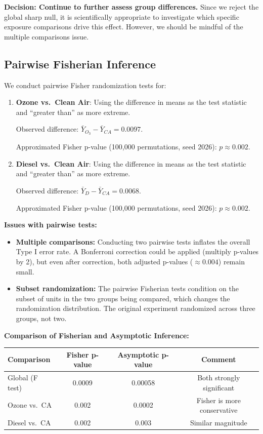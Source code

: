 \documentclass[11pt]{article}
\begin{document}
\textbf{Decision: Continue to further assess group differences.} Since we reject the global sharp null, it is scientifically appropriate to investigate which specific exposure comparisons drive this effect. However, we should be mindful of the multiple comparisons issue.

\subsection*{Pairwise Fisherian Inference}

We conduct pairwise Fisher randomization tests for:
\begin{enumerate}
  \item \textbf{Ozone vs.\ Clean Air}: Using the difference in means as the test statistic and ``greater than'' as more extreme.

  Observed difference: $\bar{Y}_{O_3} - \bar{Y}_{CA} = 0.0097$.

  Approximated Fisher p-value (100,000 permutations, seed 2026): $p \approx 0.002$.

  \item \textbf{Diesel vs.\ Clean Air}: Using the difference in means as the test statistic and ``greater than'' as more extreme.

  Observed difference: $\bar{Y}_{D} - \bar{Y}_{CA} = 0.0068$.

  Approximated Fisher p-value (100,000 permutations, seed 2026): $p \approx 0.002$.
\end{enumerate}

\textbf{Issues with pairwise tests:}
\begin{itemize}
  \item \textbf{Multiple comparisons:} Conducting two pairwise tests inflates the overall Type I error rate. A Bonferroni correction could be applied (multiply p-values by 2), but even after correction, both adjusted p-values ($\approx 0.004$) remain small.
  \item \textbf{Subset randomization:} The pairwise Fisherian tests condition on the subset of units in the two groups being compared, which changes the randomization distribution. The original experiment randomized across three groups, not two.
\end{itemize}

\textbf{Comparison of Fisherian and Asymptotic Inference:}

\begin{center}
\begin{tabular}{lccc}
\toprule
Comparison & Fisher p-value & Asymptotic p-value & Comment \\
\midrule
Global (F test) & 0.0009 & 0.00058 & Both strongly significant \\
Ozone vs.\ CA & 0.002 & 0.0002 & Fisher is more conservative \\
Diesel vs.\ CA & 0.002 & 0.003 & Similar magnitude \\
\bottomrule
\end{tabular}
\end{center}
\end{document}
